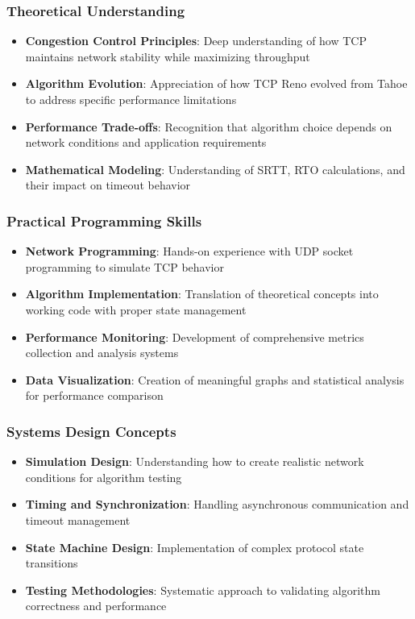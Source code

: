 \documentclass[12pt]{article}
\begin{document}
\subsubsection{Theoretical Understanding}
\begin{itemize}
    \item \textbf{Congestion Control Principles}: Deep understanding of how TCP maintains network stability while maximizing throughput
    \item \textbf{Algorithm Evolution}: Appreciation of how TCP Reno evolved from Tahoe to address specific performance limitations
    \item \textbf{Performance Trade-offs}: Recognition that algorithm choice depends on network conditions and application requirements
    \item \textbf{Mathematical Modeling}: Understanding of SRTT, RTO calculations, and their impact on timeout behavior
\end{itemize}

\subsubsection{Practical Programming Skills}
\begin{itemize}
    \item \textbf{Network Programming}: Hands-on experience with UDP socket programming to simulate TCP behavior
    \item \textbf{Algorithm Implementation}: Translation of theoretical concepts into working code with proper state management
    \item \textbf{Performance Monitoring}: Development of comprehensive metrics collection and analysis systems
    \item \textbf{Data Visualization}: Creation of meaningful graphs and statistical analysis for performance comparison
\end{itemize}

\subsubsection{Systems Design Concepts}
\begin{itemize}
    \item \textbf{Simulation Design}: Understanding how to create realistic network conditions for algorithm testing
    \item \textbf{Timing and Synchronization}: Handling asynchronous communication and timeout management
    \item \textbf{State Machine Design}: Implementation of complex protocol state transitions
    \item \textbf{Testing Methodologies}: Systematic approach to validating algorithm correctness and performance
\end{itemize}
\end{document}
